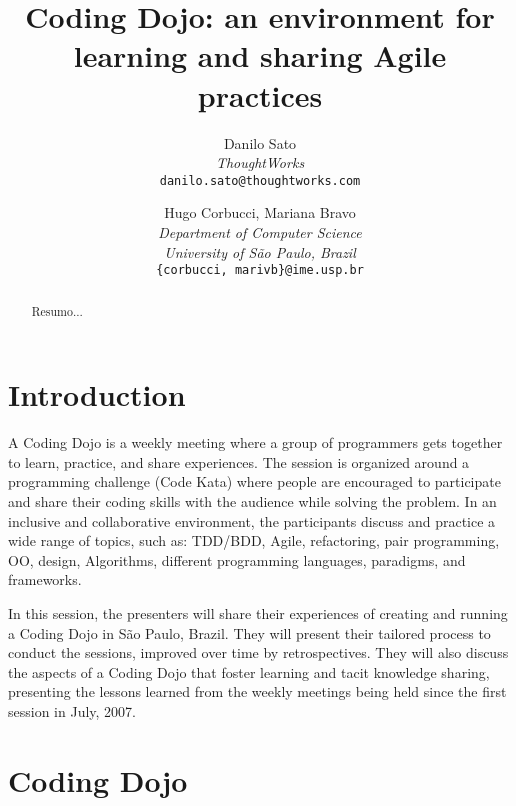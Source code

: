 \documentclass[times, 10pt,twocolumn]{article}
\begin{document}
\title{Coding Dojo: an environment for learning and sharing Agile practices}

\author{Danilo Sato\\
\textit{ThoughtWorks}\\ 
{\tt danilo.sato@thoughtworks.com}\\
\and
Hugo Corbucci, Mariana Bravo\\
\textit{Department of Computer Science}\\
\textit{University of São Paulo, Brazil}\\
{\tt \{corbucci, marivb\}@ime.usp.br}
}

\maketitle
\thispagestyle{empty}

\begin{abstract}
   Resumo... 
\end{abstract}



\section{Introduction}\label{sec:introduction}

A Coding Dojo is a weekly meeting where a group of programmers gets together to learn, practice, and share experiences. The session is organized around a programming challenge (Code Kata) where people are encouraged to participate and share their coding skills with the audience while solving the problem. In an inclusive and collaborative environment, the participants discuss and practice a wide range of topics, such as: TDD/BDD, Agile, refactoring, pair programming, OO, design, Algorithms, different programming languages, paradigms, and frameworks.

In this session, the presenters will share their experiences of creating and running a Coding Dojo in São Paulo, Brazil. They will present their tailored process to conduct the sessions, improved over time by retrospectives. They will also discuss the aspects of a Coding Dojo that foster learning and tacit knowledge sharing, presenting the lessons learned from the weekly meetings being held since the first session in July, 2007.

\section{Coding Dojo}\label{sec:dojo}
\end{document}
